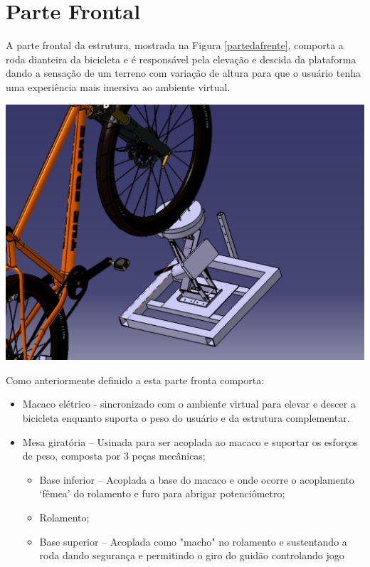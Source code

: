 \section{Parte Frontal}

A parte frontal da estrutura, mostrada na Figura \ref{partedafrente}, comporta a roda dianteira da bicicleta e é responsável pela elevação e descida da plataforma dando a sensação de um terreno com variação de altura para que o usuário tenha uma experiência mais imersiva ao ambiente virtual.

    \begin{center}
    	\includegraphics[scale=0.4]{figuras/partedafrente.png}
        \label{partedafrente}
    \end{center}


    Como anteriormente definido a esta parte fronta comporta:
    \begin{itemize}
        \item Macaco elétrico - sincronizado com o ambiente virtual para elevar e descer a bicicleta enquanto suporta o peso do usuário e da estrutura complementar.

        \item Mesa giratória – Usinada para ser acoplada ao macaco e suportar os esforços de peso, composta por 3 peças mecânicas;
            \begin{itemize}
                \item Base inferior – Acoplada a base do macaco e onde ocorre o acoplamento ‘fêmea’ do rolamento e furo para abrigar potenciômetro;
                \item Rolamento;
                \item Base superior – Acoplada como "macho" no rolamento e sustentando a roda dando segurança e permitindo o giro do guidão controlando jogo
            \end{itemize}
    \end{itemize}


